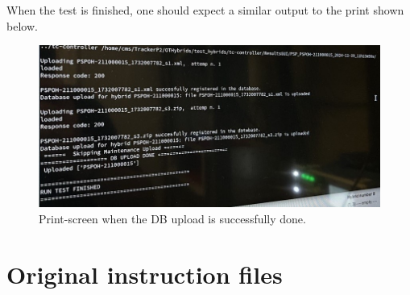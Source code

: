\documentclass[10pt,a4paper]{article}
\begin{document}
\newpage

When the test is finished, one should expect a similar output to the print shown below. 

\begin{figure}[h!]
\centering
 \includegraphics[width=1.0\linewidth]{Pictures/DBupload-success.jpg} 
  \caption{Print-screen when the DB upload is successfully done.}
  \label{DBupload}
\end{figure}

\newpage

\appendix

\appendixpage
\section{Original instruction files}


\end{document}
